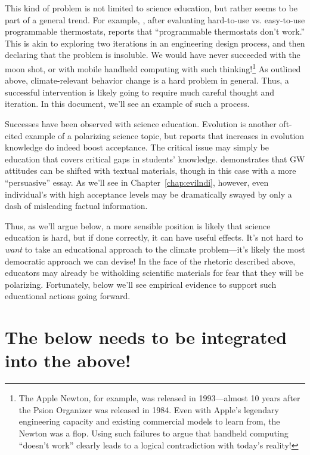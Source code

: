 This kind of problem is not limited to science education, but rather seems to be
part of a general trend. For example, \textcite{fraunhoffer}, after evaluating
hard-to-use vs. easy-to-use programmable thermostats, reports that “programmable
thermostats don't work.” This is akin to exploring two iterations in an
engineering design process, and then declaring that the problem is insoluble. We
would have never succeeded with the moon shot, or with mobile handheld computing
with such thinking!\footnote{The Apple Newton, for example, was released in
    1993---almost 10 years after the Psion Organizer was released in 1984. Even
    with Apple's legendary engineering capacity and existing commercial models
    to learn from, the Newton was a flop. Using such failures to argue that
    handheld computing “doesn't work” clearly leads to a logical contradiction
    with today's reality!}
As outlined above, climate-relevant behavior change is a hard problem in
general.  Thus, a successful intervention is likely going to require much
careful thought and iteration. In this document, we'll see an example of such a
process.

Successes have been observed with science education. Evolution is another
oft-cited example of a polarizing science topic, but
\textcite{shtulman_learning_2008} reports that increases in evolution knowledge
do indeed boost acceptance. The critical issue may simply be education that
covers critical gaps in students' knowledge. \textcite{sinatra_promoting_2012}
demonstrates that GW attitudes can be shifted with textual materials, though in
this case with a more “persuasive” essay. As we'll see in
Chapter~\ref{chap:evilndi}, however, even individual's with high acceptance
levels may be dramatically swayed by only a dash of misleading factual
information. 

Thus, as we'll argue below, a more sensible position is likely that science
education is hard, but if done correctly, it can have useful effects.
It's not hard to \emph{want} to take an educational approach to the climate
problem---it's likely the most democratic approach we can devise! In the face of
the rhetoric described above, educators may already be witholding scientific
materials for fear that they will be polarizing. Fortunately,
below we'll see empirical evidence to support such educational actions going
forward. 

\section{The below needs to be integrated into the above!}

